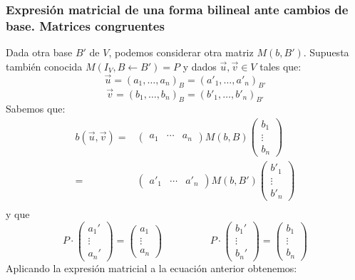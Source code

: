 \documentclass[x11names,table]{report}
\begin{document}
\subsubsection*{Expresión matricial de una forma bilineal ante cambios de base. Matrices congruentes}

Dada otra base $B'$ de $V$, podemos considerar otra matriz $M(b,B')$. Supuesta también conocida $M(I_V,B\leftarrow B')=P$ y dados $\vec{u},\vec{v}\in V$ tales que:
\[\vec{u}=(a_1,\dots,a_n)_B=(a'_1,\dots,a'_n)_{B'}\]\[
\vec{v}=(b_1,\dots,b_n)_B=(b'_1,\dots,b'_n)_{B'}\]
Sabemos que:
\[
\begin{split}
b(\vec{u},\vec{v})=&\begin{pmatrix}
a_1 & \cdots & a_n
\end{pmatrix}M(b,B)\begin{pmatrix}
b_1 \\ \vdots \\ b_n
\end{pmatrix}\\
=&\begin{pmatrix}
a'_1 & \cdots & a'_n
\end{pmatrix}M(b,B')\begin{pmatrix}
b'_1 \\ \vdots \\ b'_n
\end{pmatrix}\\
\end{split}
\]
y que
\[
P\cdot\begin{pmatrix}
a_1'\\ \vdots \\ a_n'
\end{pmatrix}=\begin{pmatrix}
a_1\\ \vdots \\ a_n
\end{pmatrix}\hspace{2cm}P\cdot\begin{pmatrix}
b_1'\\ \vdots \\ b_n'
\end{pmatrix}=\begin{pmatrix}
b_1\\ \vdots \\ b_n
\end{pmatrix}
\]
Aplicando la expresión matricial a la ecuación anterior obtenemos:
\end{document}
